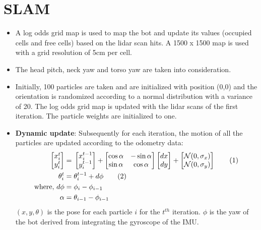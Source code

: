 \documentclass[english]{article}
\newcommand\numberthis{\addtocounter{equation}{1}\tag{\theequation}}
\begin{document}
\section{SLAM}
\begin{itemize}
\item A log odds grid map is used to map the bot and update its values (occupied cells and free cells) based on the lidar scan hits. A 1500 x 1500 map is used with a grid resolution of 5cm per cell.
\item The head pitch, neck yaw and torso yaw are taken into consideration. 
\item Initially, 100 particles are taken and are initialized with position (0,0) and the orientation is randomized according to a normal distribution with a variance of 20\degree. The log odds grid map is updated with the lidar scans of the first iteration. The particle weights are initialized to one. 
\item \textbf{Dynamic update}: Subsequently for each iteration, the motion of all the particles are updated according to the odometry data:
\begin{align*}
	\begin{bmatrix}
	x_{i}^{t} \\ y_{i}^{t}
	\end{bmatrix} =&\; 
	\begin{bmatrix}
	x_{i}^{t-1} \\ y_{i}^{t-1}
	\end{bmatrix} + 
	\begin{bmatrix}
	\cos\alpha & -\sin\alpha \\
	\sin\alpha & \cos\alpha
	\end{bmatrix}
	\begin{bmatrix}
	dx \\ dy
	\end{bmatrix} + 
	\begin{bmatrix}
	\mathcal{N}(0,\sigma_x) \\ \mathcal{N}(0,\sigma_y)
	\end{bmatrix} \numberthis \\
	\theta_{i}^{t} =&\; \theta_{i}^{t-1} + d\phi \numberthis \\
  	 \text{where, } d\phi =&\; \phi_{i} - \phi_{i-1} \\
  	\alpha =&\; \theta_{i-1} - \phi_{i-1}
\end{align*}
$(x,y,\theta)$ is the pose for each particle $i$ for the $t^{th}$ iteration. $\phi$ is the yaw of the bot derived from integrating the gyroscope of the IMU. \\

\end{itemize}
\end{document}
